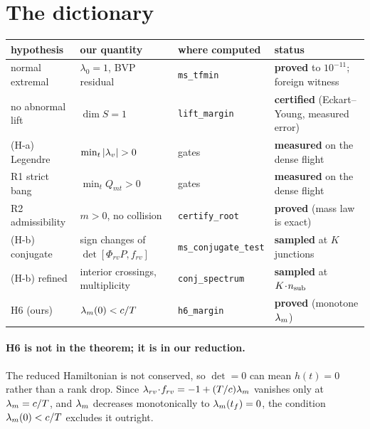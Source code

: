 \documentclass[11pt]{article}
\newcommand{\tf}{t_f}\newcommand{\R}{\mathbb{R}}
\begin{document}
\section{The dictionary}
\begin{center}\small
\begin{tabular}{@{}llll@{}}
\toprule
hypothesis & our quantity & where computed & status \\
\midrule
normal extremal & $\lambda_0=1$, BVP residual & \texttt{ms\_tfmin} & \textbf{proved} to $10^{-11}$; foreign witness \\
no abnormal lift & $\dim S=1$ & \texttt{lift\_margin} & \textbf{certified} (Eckart--Young, measured error) \\
(H-a) Legendre & $\min_t|\lv|>0$ & gates & \textbf{measured} on the dense flight \\
R1 strict bang & $\min_t Q_{mt}>0$ & gates & \textbf{measured} on the dense flight \\
R2 admissibility & $m>0$, no collision & \texttt{certify\_root} & \textbf{proved} (mass law is exact) \\
(H-b) conjugate & sign changes of $\det[\Phi_{rv}P,f_{rv}]$ & \texttt{ms\_conjugate\_test} & \textbf{sampled} at $K$ junctions \\
(H-b) refined & interior crossings, multiplicity & \texttt{conj\_spectrum} & \textbf{sampled} at $K\!\cdot\!n_{\rm sub}$ \\
H6 (ours) & $\lambda_m(0)<c/T$ & \texttt{h6\_margin} & \textbf{proved} (monotone $\lambda_m$) \\
\bottomrule
\end{tabular}
\end{center}

\paragraph{H6 is not in the theorem; it is in our reduction.} The reduced
Hamiltonian is not conserved, so $\det=0$ can mean $h(t)=0$ rather than a rank
drop. Since $\lambda_{rv}\!\cdot\!f_{rv}=-1+(T/c)\lambda_m$ vanishes only at
$\lambda_m=c/T$, and $\lambda_m$ decreases monotonically to $\lm(\tf)=0$, the condition
$\lambda_m(0)<c/T$ excludes it outright.
\end{document}

